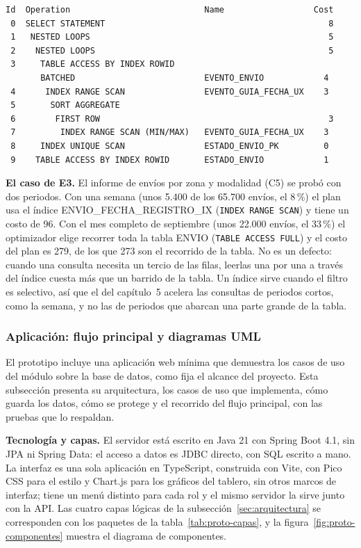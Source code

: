 \begin{lstlisting}[style=sqlpro]
Id  Operation                           Name                  Cost
 0  SELECT STATEMENT                                             8
 1   NESTED LOOPS                                                5
 2    NESTED LOOPS                                               5
 3     TABLE ACCESS BY INDEX ROWID
       BATCHED                          EVENTO_ENVIO            4
 4      INDEX RANGE SCAN                EVENTO_GUIA_FECHA_UX    3
 5       SORT AGGREGATE
 6        FIRST ROW                                              3
 7         INDEX RANGE SCAN (MIN/MAX)   EVENTO_GUIA_FECHA_UX    3
 8     INDEX UNIQUE SCAN                ESTADO_ENVIO_PK         0
 9    TABLE ACCESS BY INDEX ROWID       ESTADO_ENVIO            1
\end{lstlisting}

\textbf{El caso de E3.} El informe de envíos por zona y modalidad (C5)
se probó con dos periodos. Con una semana (unos 5.400 de los 65.700
envíos, el 8\,\%) el plan usa el índice ENVIO\_FECHA\_REGISTRO\_IX
(\texttt{INDEX RANGE SCAN}) y tiene un costo de 96. Con el mes completo de
septiembre (unos 22.000 envíos, el 33\,\%) el optimizador elige recorrer toda
la tabla ENVIO (\texttt{TABLE ACCESS FULL}) y el costo del plan es 279, de
los que 273 son el recorrido de la tabla. No es un defecto: cuando una
consulta necesita un tercio de las filas, leerlas una por una a través del
índice cuesta más que un barrido de la tabla. Un índice sirve cuando
el filtro es selectivo, así que el del capítulo~5 acelera las consultas
de periodos cortos, como la semana, y no las de periodos que abarcan una
parte grande de la tabla.


\subsubsection{Aplicación: flujo principal y diagramas UML}
\label{sec:proto-aplicacion}

El prototipo incluye una aplicación web mínima que demuestra los casos
de uso del módulo sobre la base de datos, como fija el alcance del
proyecto. Esta subsección presenta su arquitectura, los
casos de uso que implementa, cómo guarda los datos, cómo se protege y el
recorrido del flujo principal, con las pruebas que lo respaldan.

\textbf{Tecnología y capas.} El servidor está escrito en Java 21 con
Spring Boot 4.1, sin JPA ni Spring Data: el acceso a datos es JDBC
directo, con SQL escrito a mano. La interfaz es una sola aplicación en
TypeScript, construida con Vite, con Pico CSS para el estilo y Chart.js para
los gráficos del tablero, sin otros marcos de interfaz; tiene un menú
distinto para cada rol y el mismo servidor la sirve junto con la
API. Las cuatro capas lógicas de la subsección~\ref{sec:arquitectura} se
corresponden con los paquetes de la tabla~\ref{tab:proto-capas}, y la
figura~\ref{fig:proto-componentes} muestra el diagrama de componentes.

